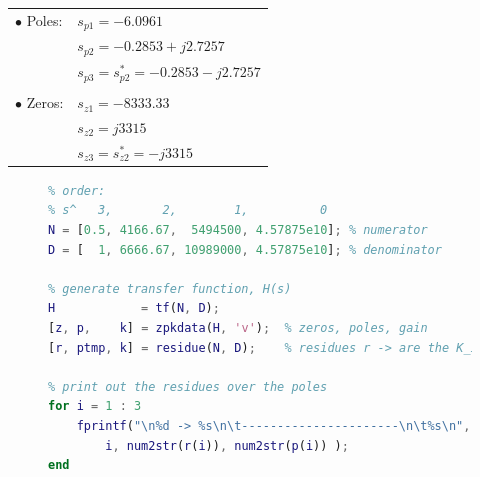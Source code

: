 \documentclass{homework}
\begin{document}
	\vspace{1em}
	\noindent
	\begin{tabular}{ll}
		$\bullet$ Poles: & $s_{p1} = -6.0961$ \\
		& $s_{p2} = -0.2853 + j2.7257$ \\
		& $s_{p3} = s_{p2}^* = -0.2853 - j2.7257$ \\
		& \\
		$\bullet$ Zeros: & $s_{z1} = -8333.33$ \\
		& $s_{z2} = j3315$ \\
		& $s_{z3} = s_{z2}^* = -j3315$
	\end{tabular}
	
	\vspace{1em}
	
	\begin{figure}[H]
	\begin{lstlisting}[language=matlab, caption={MATLAB code for factoring the transfer function.},label={lst:factor}]
% coefficients of the transfer function:
% order:
% s^   3,       2,        1,          0
N = [0.5, 4166.67,  5494500, 4.57875e10]; % numerator
D = [  1, 6666.67, 10989000, 4.57875e10]; % denominator

% generate transfer function, H(s)
H            = tf(N, D);
[z, p,    k] = zpkdata(H, 'v');  % zeros, poles, gain
[r, ptmp, k] = residue(N, D);    % residues r -> are the K_i values

% print out the residues over the poles
for i = 1 : 3
	fprintf("\n%d -> %s\n\t----------------------\n\t%s\n", ...
		i, num2str(r(i)), num2str(p(i)) );
end
	\end{lstlisting}
	\end{figure}

	\pagebreak
\end{document}
